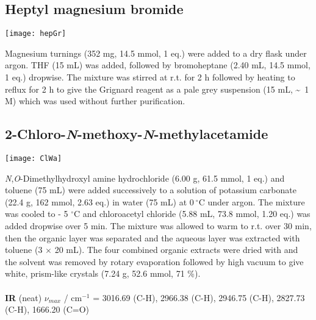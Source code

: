 {{{{{{\subsection{Heptyl magnesium bromide }


\begin{scheme}[H]
	\begin{center}
		\texttt{[image: hepGr]}
	\end{center}
\end{scheme}

Magnesium turnings (352 mg, 14.5 mmol, 1 eq.) were added to a dry flask under argon. THF (15 mL) was added, followed by bromoheptane (2.40 mL, 14.5 mmol, 1 eq.) dropwise. The mixture was stirred at r.t. for 2 h followed by heating to reflux for 2 h to give the Grignard reagent as a pale grey suspension (15 mL, \textasciitilde ~1 M) which was used without further purification.

\subsection{2-Chloro-\textit{N}-methoxy-\textit{N}-methylacetamide }

\begin{scheme}[H]
	\begin{center}
		\texttt{[image: ClWa]}
	\end{center}
\end{scheme}


\textit{N},\textit{O}-Dimethylhydroxyl amine hydrochloride (6.00 g, 61.5 mmol, 1 eq.) and toluene (75 mL) were 
added successively to a solution of potassium carbonate (22.4 g, 162 mmol, 2.63 eq.) in water (75 mL) at $0\ ^{\circ}$C under argon. 
The mixture was cooled to - 5 $^{\circ}$C and chloroacetyl chloride (5.88 mL, 73.8 mmol, 1.20 eq.) was 
added dropwise over 5 min. The mixture was allowed to warm to r.t. over 30 min, 
then the organic layer was separated and the aqueous layer was extracted with toluene (3 $\times$ 20 mL). The 
four combined organic extracts were dried with  and the solvent was removed by rotary 
evaporation followed by high vacuum to give white, prism-like crystals (7.24 g, 52.6 mmol, 71 \%).
\\[1\baselineskip]
\\[1\baselineskip]
\textbf{IR} (neat) $\nu_{max}$ / cm$^{-1}$ = 
3016.69 (C-H),
2966.38 (C-H),
2946.75 (C-H),
2827.73 (C-H),
1666.20 (C=O)}
\\[1\baselineskip]
}}}}}
